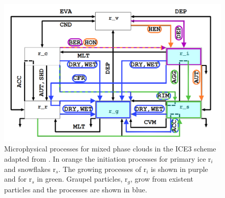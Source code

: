 \begin{figure}[h]
	\centering
	\includegraphics[width=\textwidth]{./fig_MEPS/ICE3_scheme_copy}
	\caption{Microphysical processes for mixed phase clouds in the ICE3 scheme adapted from \cite{meteo_france_meso-nh_2009}. In orange the initiation processes for primary ice r$_i$ and snowflakes r$_s$. The growing processes of r$_i$ is shown in purple and for r$_s$ in green. Graupel particles, r$_g$, grow from existent particles and the processes are shown in blue. }\label{fig:ICE3_scheme}
\end{figure}